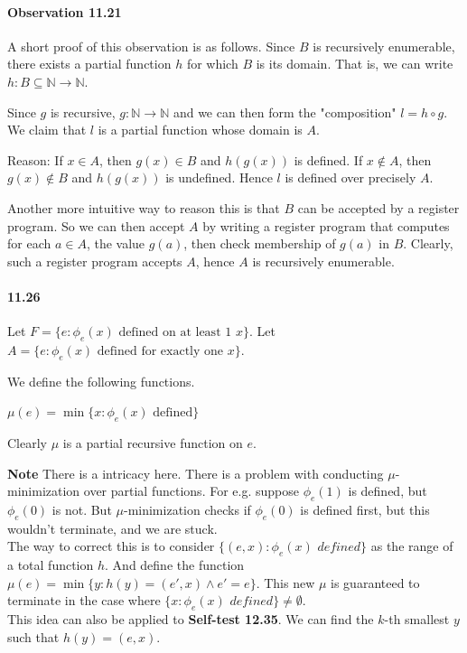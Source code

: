 \documentclass{article}
\begin{document}
\paragraph{Observation 11.21} A short proof of this observation is as follows. Since $B$ is recursively enumerable, there exists a partial function $h$ for which $B$ is its domain. That is, we can write $h:B\subseteq \mathbb{N}\rightarrow \mathbb{N}$.

Since $g$ is recursive, $g:\mathbb{N}\rightarrow \mathbb{N}$ and we can then form the "composition" $l=h\circ g$. We claim that $l$ is a partial function whose domain is $A$.

Reason: If $x\in A$, then $g(x)\in B$ and $h(g(x))$ is defined. If $x\notin A$, then $g(x)\notin B$ and $h(g(x))$ is undefined. Hence $l$ is defined over precisely $A$.

Another more intuitive way to reason this is that $B$ can be accepted by a register program. So we can then accept $A$ by writing a register program that computes for each $a\in A$, the value $g(a)$, then check membership of $g(a)$ in $B$. Clearly, such a register program accepts $A$, hence $A$ is recursively enumerable.

\paragraph{11.26} Let $F=\{e:\phi_e(x) \text{ defined on at least 1 } x\}$. Let $A=\{e:\phi_e(x) \text{ defined for exactly one } x\}$.

We define the following functions.
\begin{center}
	$\mu(e) = \min\{x:\phi_e(x) \text{ defined}\}$
\end{center}
Clearly $\mu$ is a partial recursive function on $e$.

\textbf{Note} There is a intricacy here. There is a problem with conducting $\mu$-minimization over partial functions. For e.g. suppose $\phi_e(1)$ is defined, but $\phi_e(0)$ is not. But $\mu$-minimization checks if $\phi_e(0)$ is defined first, but this wouldn't terminate, and we are stuck.\\
The way to correct this is to consider $\{(e,x):\phi_e(x) \textit{ defined}\}$ as the range of a total function $h$. And define the function $\mu(e) = \min \{y : h(y) = (e',x)\land e' = e\}$. This new $\mu$ is guaranteed to terminate in the case where $\{x : \phi_e(x) \textit{ defined}\}\neq \emptyset$. \\
This idea can also be applied to \textbf{Self-test 12.35}. We can find the $k$-th smallest $y$ such that $h(y) = (e, x)$.
\end{document}
